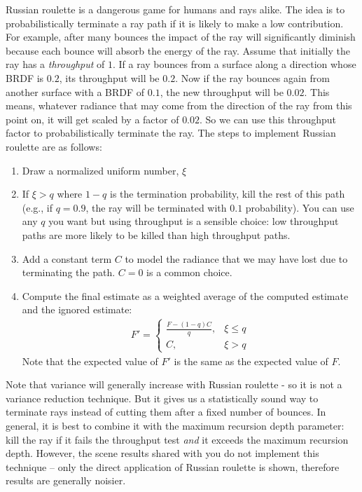 \documentclass[12pt]{article}
\begin{document}
Russian roulette is a dangerous game for humans and rays alike. The idea
is to probabilistically terminate a ray path if it is likely to make a
low contribution.  For example, after many bounces the impact of the ray
will significantly diminish because each bounce will absorb the energy
of the ray. Assume that initially the ray has a \emph{throughput} of
$1$. If a ray bounces from a surface along a direction whose BRDF is
$0.2$, its throughput will be $0.2$. Now if the ray bounces again from
another surface with a BRDF of $0.1$, the new throughput will be $0.02$.
This means, whatever radiance that may come from the direction of the
ray from this point on, it will get scaled by a factor of $0.02$. So we
can use this throughput factor to probabilistically terminate the ray. 
The steps to implement Russian roulette are as follows:
%
\begin{enumerate}
\item Draw a normalized uniform number, $\xi$
\item If $\xi > q$ where $1 - q$ is the termination probability, kill the
rest of this path (e.g., if $q = 0.9$, the ray will be terminated with
$0.1$ probability). You can use any $q$ you want but using throughput is
a sensible choice: low throughput paths are more likely to be killed than
high throughput paths.
\item Add a constant term $C$ to model the radiance that we may have
lost due to terminating the path. $C = 0$ is a common choice.
\item Compute the final estimate as a weighted average of the computed
estimate and the ignored estimate:
%
\begin{align}
F' =
\begin{cases}
\frac{F - (1 - q)C}{q}, & \xi \le q \\
C, & \xi > q
\end{cases}
\end{align}
%
Note that the expected value of $F'$ is the same as the expected value
of $F$.
\end{enumerate}
%
Note that variance will generally increase with Russian roulette - so it
is not a variance reduction technique. But it gives us a statistically
sound way to terminate rays instead of cutting them after a fixed number
of bounces.  In general, it is best to combine it with the maximum
recursion depth parameter: kill the ray if it fails the throughput test
\emph{and} it exceeds the maximum recursion depth. However, the scene
results shared with you do not implement this technique -- only the
direct application of Russian roulette is shown, therefore results are
generally noisier.
\end{document}
